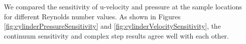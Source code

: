 \documentclass[12pt]{aiaa-pretty}
\begin{document}
We compared the sensitivity of u-velocity and pressure at the sample locations for different Reynolds number values. As shown in Figures \ref{fig:cylinderPressureSensitivity} and \ref{fig:cylinderVelocitySensitivity}, the continuum sensitivity and complex step results agree well with each other.

%
\begin{figure}[H]
	\centering
	\quad
	\\
	\quad
	\\

\end{figure}
\end{document}
